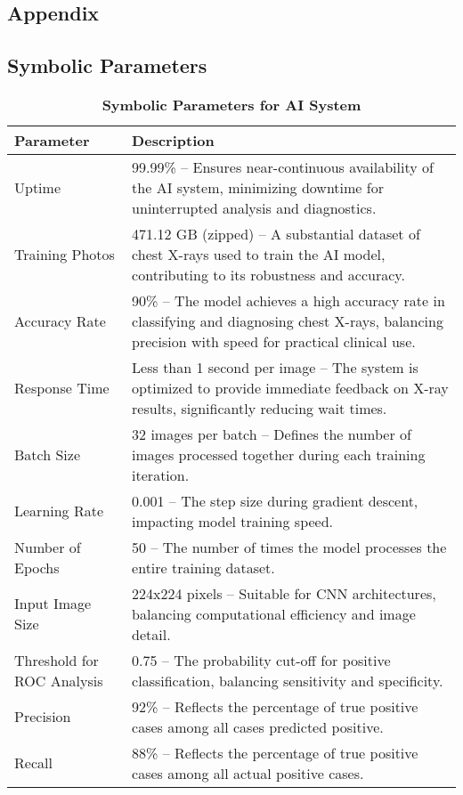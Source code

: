 \documentclass[12pt, titlepage]{article}
\begin{document}
\begin{enumerate}
\begin{enumerate}
\begin{enumerate}
\begin{enumerate}
\newpage




\newpage

\section{Appendix}

\subsection{Symbolic Parameters}
\renewcommand{\arraystretch}{1.3}

\begin{table}[H]
  \centering
  \noindent
  \begin{tabular}{|p{3.5cm}|p{9.5cm}|}
      \hline
      \rowcolor{lightgray} \textbf{Parameter} & \textbf{Description} \\
      \hline
      Uptime & 99.99\% – Ensures near-continuous availability of the AI system, minimizing downtime for uninterrupted analysis and diagnostics. \\
      \hline
      Training Photos & 471.12 GB (zipped) – A substantial dataset of chest X-rays used to train the AI model, contributing to its robustness and accuracy. \\
      \hline
      Accuracy Rate & 90\% – The model achieves a high accuracy rate in classifying and diagnosing chest X-rays, balancing precision with speed for practical clinical use. \\
      \hline
      Response Time & Less than 1 second per image – The system is optimized to provide immediate feedback on X-ray results, significantly reducing wait times. \\
      \hline
      Batch Size & 32 images per batch – Defines the number of images processed together during each training iteration. \\
      \hline
      Learning Rate & 0.001 – The step size during gradient descent, impacting model training speed. \\
      \hline
      Number of Epochs & 50 – The number of times the model processes the entire training dataset. \\
      \hline
      Input Image Size & 224x224 pixels – Suitable for CNN architectures, balancing computational efficiency and image detail. \\
      \hline
      Threshold for ROC Analysis & 0.75 – The probability cut-off for positive classification, balancing sensitivity and specificity. \\
      \hline
      Precision & 92\% – Reflects the percentage of true positive cases among all cases predicted positive. \\
      \hline
      Recall & 88\% – Reflects the percentage of true positive cases among all actual positive cases. \\
      \hline
  \end{tabular}
  \caption{\textbf{Symbolic Parameters for AI System}}
\end{table}



\end{enumerate}
\end{enumerate}
\end{enumerate}
\end{enumerate}
\end{document}
